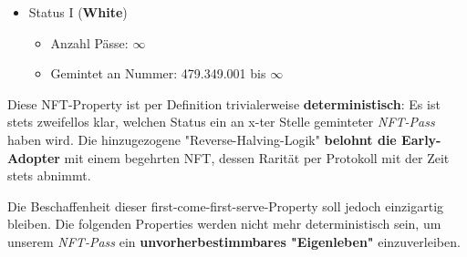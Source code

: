 \begin{NFT-Prop}
\begin{itemize}
    \begin{itemize}
    	\item Anzahl Pässe: 419.430.400
    	\item Gemintet an Nummer: 59.918.601 bis 479.349.000
    \end{itemize}
    \item Status I (\textbf{White})
    \begin{itemize}
    	\item Anzahl Pässe: $\infty$
    	\item Gemintet an Nummer: 479.349.001 bis $\infty$
    \end{itemize}
\end{itemize}

\end{NFT-Prop}

\vspace{0.3cm}

Diese NFT-Property ist per Definition trivialerweise \textbf{deterministisch}: Es ist stets zweifellos klar, welchen Status ein an x-ter Stelle geminteter \textit{NFT-Pass} haben wird. Die hinzugezogene "Reverse-Halving-Logik" \textbf{belohnt die Early-Adopter} mit einem begehrten NFT, dessen Rarität per Protokoll mit der Zeit stets abnimmt.

Die Beschaffenheit dieser first-come-first-serve-Property soll jedoch einzigartig bleiben. Die folgenden Properties werden nicht mehr deterministisch sein, um unserem \textit{NFT-Pass} ein \textbf{unvorherbestimmbares "Eigenleben"} einzuverleiben. 


\vspace{0.5cm}


